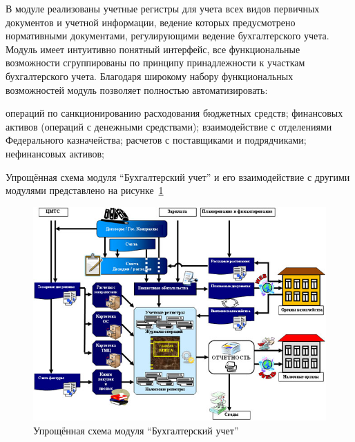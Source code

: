 \documentclass[14pt,a4paper]{reportmod}
\begin{document}
В модуле реализованы учетные регистры для учета всех видов первичных документов и учетной информации, ведение которых предусмотрено нормативными документами, регулирующими ведение бухгалтерского учета. Модуль имеет интуитивно понятный интерфейс, все функциональные возможности сгруппированы по принципу принадлежности к участкам бухгалтерского учета. Благодаря широкому набору функциональных возможностей модуль позволяет полностью автоматизировать:
\begin{enumerate}
   операций по санкционированию расходования бюджетных средств;
   финансовых активов (операций с денежными средствами);
   взаимодействие с отделениями Федерального казначейства;
   расчетов с поставщиками и подрядчиками;
   нефинансовых активов;
\end{enumerate}
Упрощённая схема модуля ``Бухгалтерский учет'' и его взаимодействие с другими модулями представлено на рисунке~\ref{pic:parus_pic2}
\begin{figure}
  \centering
  \includegraphics[scale=0.6]{pics/parus_img2}
  \caption{Упрощённая схема модуля ``Бухгалтерский учет''}
  \label{pic:parus_pic2}
\end{figure}
\end{document}
